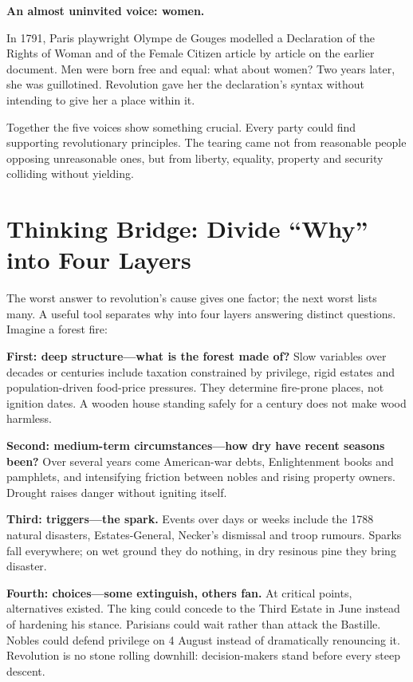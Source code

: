 \textbf{An almost uninvited voice: women.}

In 1791, Paris playwright Olympe de Gouges modelled a Declaration of the Rights of Woman and of the Female Citizen article by article on the earlier document. Men were born free and equal: what about women? Two years later, she was guillotined. Revolution gave her the declaration's syntax without intending to give her a place within it.

Together the five voices show something crucial. Every party could find supporting revolutionary principles. The tearing came not from reasonable people opposing unreasonable ones, but from liberty, equality, property and security colliding without yielding.

\section[Thinking Bridge: Four Layers of Why]{Thinking Bridge: Divide ``Why'' into Four Layers}
The worst answer to revolution's cause gives one factor; the next worst lists many. A useful tool separates why into four layers answering distinct questions. Imagine a forest fire:

\textbf{First: deep structure---what is the forest made of?} Slow variables over decades or centuries include taxation constrained by privilege, rigid estates and population-driven food-price pressures. They determine fire-prone places, not ignition dates. A wooden house standing safely for a century does not make wood harmless.

\textbf{Second: medium-term circumstances---how dry have recent seasons been?} Over several years come American-war debts, Enlightenment books and pamphlets, and intensifying friction between nobles and rising property owners. Drought raises danger without igniting itself.

\textbf{Third: triggers---the spark.} Events over days or weeks include the 1788 natural disasters, Estates-General, Necker's dismissal and troop rumours. Sparks fall everywhere; on wet ground they do nothing, in dry resinous pine they bring disaster.

\textbf{Fourth: choices---some extinguish, others fan.} At critical points, alternatives existed. The king could concede to the Third Estate in June instead of hardening his stance. Parisians could wait rather than attack the Bastille. Nobles could defend privilege on 4 August instead of dramatically renouncing it. Revolution is no stone rolling downhill: decision-makers stand before every steep descent.

